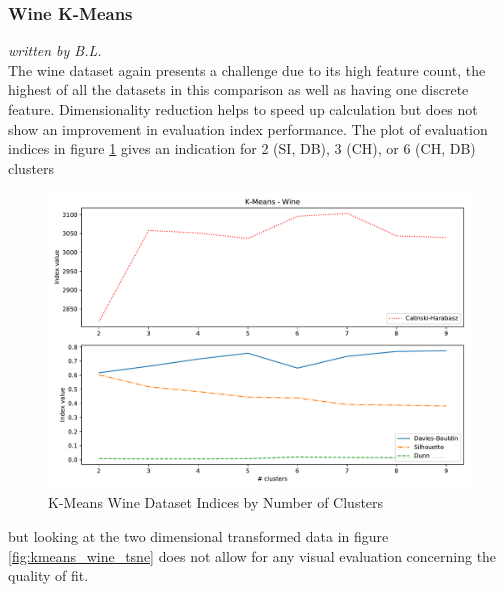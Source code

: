 \subsubsection{Wine K-Means}
\textit{written by B.L.}\\

The wine dataset again presents a challenge due to its high feature count, the highest of all the datasets in this comparison as well as having one discrete feature. Dimensionality reduction helps to speed up calculation but does not show an improvement in evaluation index performance. The plot of evaluation indices in figure \ref{fig:kmeans_wine_indices_comparison} gives an indication for 2 (\gls{SI}, \gls{DB}), 3 (\gls{CH}), or 6 (\gls{CH}, \gls{DB}) clusters

\vspace{-0.5cm}
\begin{figure}[h]
\caption{K-Means Wine Dataset Indices by Number of Clusters}
\begin{center}
\includegraphics[width=1.0\textwidth]{images/kmeans_wine_index_plot.pdf}
\end{center}
\label{fig:kmeans_wine_indices_comparison}
\end{figure}

but looking at the two dimensional transformed data in figure \ref{fig:kmeans_wine_tsne} does not allow for any visual evaluation concerning the quality of fit.



